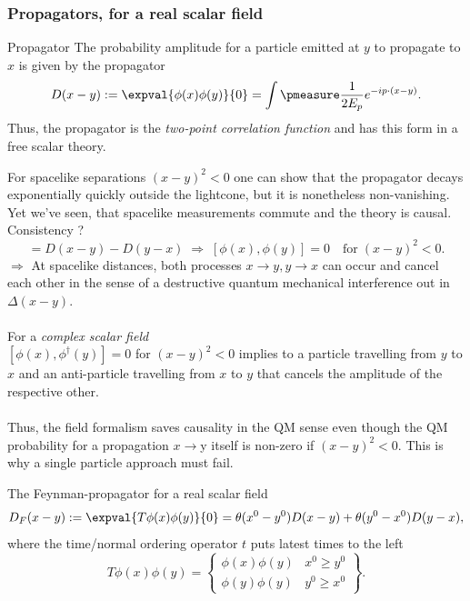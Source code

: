 \subsubsection{Propagators, for a real scalar field}
\begin{mybox}{Propagator}
	The probability amplitude for a particle emitted at $y$ to propagate to $x$ is given by the propagator
	\begin{equation}
		D(x-y) := \expval{\phi(x) \phi(y)}{0} = \int \pmeasure \frac{1}{2 E_p} e^{- i p\cdot (x-y)}.
	\end{equation}
	Thus, the propagator is the \emph{two-point correlation function} and has this form in a free scalar theory.
\end{mybox}
For spacelike separations $(x-y)^2<0$ one can show that the propagator decays exponentially quickly outside the lightcone, but it is nonetheless non-vanishing. Yet we've seen, that spacelike measurements commute and the theory is causal. Consistency ?
\begin{equation}
	[\phi(x),\phi(y)]=D(x-y) - D(y-x) \; \Rightarrow \; [\phi(x),\phi(y)]=0 \quad \mathrm{for} \; (x-y)^2<0.
\end{equation}
$\Rightarrow$ At  spacelike distances, both processes $x\rightarrow y, y \rightarrow x$ can occur and cancel each other in the sense of a destructive quantum mechanical interference out in $\Delta(x-y)$.\\
\\
For a \emph{complex scalar field}\\
$[\phi(x),\phi^{\dagger}(y)]=0$ for $(x-y)^2<0$ implies to a particle travelling from $y$ to $x$ and an anti-particle travelling from $x$ to $y$ that cancels the amplitude of the respective other.\\
\\
Thus, the field formalism saves causality in the QM sense even though the QM probability for a propagation $x\rightarrow$y itself is non-zero if $(x-y)^2<0$. This is why a single particle approach must fail.\\
\begin{mybox}{The Feynman-propagator for a real scalar field}
	\begin{equation}
		D_F(x-y) := \expval{T \phi(x) \phi(y)}{0} = \theta(x^0-y^0) D(x-y) + \theta(y^0-x^0) D(y-x),
	\end{equation}
	where the time/normal ordering operator $t$ puts latest times to the left
	\begin{equation}
		T\phi(x)\phi(y) = \left\{ \begin{array}{lr}
		\phi(x) \phi(y) & x^0 \geq y^0\\
		\phi(y)\phi(y) & y^0 \geq x^0
		\end{array}\right\} .
	\end{equation}
\end{mybox}
